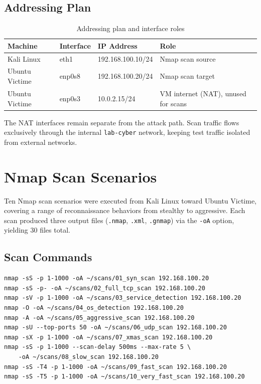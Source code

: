 \subsection{Addressing Plan}

\begin{table}[H]
\centering
\caption{Addressing plan and interface roles}
\label{tab:adressage}
\begin{tabular}{llll}
\toprule
\textbf{Machine} & \textbf{Interface} & \textbf{IP Address} & \textbf{Role} \\
\midrule
Kali Linux & eth1 & 192.168.100.10/24 & Nmap scan source \\
Ubuntu Victime & enp0s8 & 192.168.100.20/24 & Nmap scan target \\
Ubuntu Victime & enp0s3 & 10.0.2.15/24 & VM internet (NAT), unused for scans \\
\bottomrule
\end{tabular}
\end{table}

\noindent The NAT interfaces remain separate from the attack path. Scan traffic flows exclusively through the internal \texttt{lab-cyber} network, keeping test traffic isolated from external networks.

\section{Nmap Scan Scenarios}

Ten Nmap scan scenarios were executed from Kali Linux toward Ubuntu Victime, covering a range of reconnaissance behaviors from stealthy to aggressive. Each scan produced three output files (\texttt{.nmap}, \texttt{.xml}, \texttt{.gnmap}) via the \texttt{-oA} option, yielding 30 files total.

\subsection{Scan Commands}

\begin{lstlisting}[caption={Nmap commands executed from Kali Linux}]
nmap -sS -p 1-1000 -oA ~/scans/01_syn_scan 192.168.100.20
nmap -sS -p- -oA ~/scans/02_full_tcp_scan 192.168.100.20
nmap -sV -p 1-1000 -oA ~/scans/03_service_detection 192.168.100.20
nmap -O -oA ~/scans/04_os_detection 192.168.100.20
nmap -A -oA ~/scans/05_aggressive_scan 192.168.100.20
nmap -sU --top-ports 50 -oA ~/scans/06_udp_scan 192.168.100.20
nmap -sX -p 1-1000 -oA ~/scans/07_xmas_scan 192.168.100.20
nmap -sS -p 1-1000 --scan-delay 500ms --max-rate 5 \
    -oA ~/scans/08_slow_scan 192.168.100.20
nmap -sS -T4 -p 1-1000 -oA ~/scans/09_fast_scan 192.168.100.20
nmap -sS -T5 -p 1-1000 -oA ~/scans/10_very_fast_scan 192.168.100.20
\end{lstlisting}

